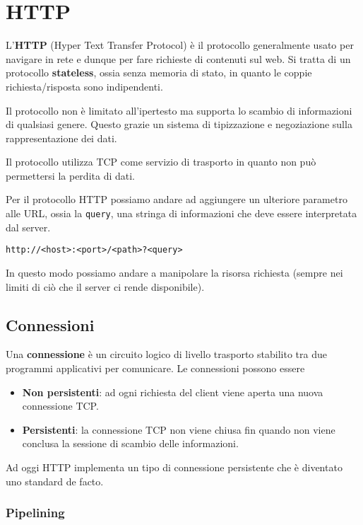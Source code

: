 \section{HTTP}
L'\textbf{HTTP} (Hyper Text Transfer Protocol) è il protocollo generalmente usato per navigare in
rete e dunque per fare richieste di contenuti sul web. Si tratta di un protocollo
\textbf{stateless}, ossia senza memoria di stato, in quanto le coppie richiesta/risposta sono
indipendenti.

Il protocollo non è limitato all'ipertesto ma supporta lo scambio di informazioni di qualsiasi 
genere. Questo grazie un sistema di tipizzazione e negoziazione sulla rappresentazione dei dati.

Il protocollo utilizza TCP come servizio di trasporto in quanto non può permettersi la perdita di
dati.

Per il protocollo HTTP possiamo andare ad aggiungere un ulteriore parametro alle URL, ossia la
\verb|query|, una stringa di informazioni che deve essere interpretata dal server.
\begin{center} \verb|http://<host>:<port>/<path>?<query>| \end{center}
In questo modo possiamo andare a manipolare la risorsa richiesta (sempre nei limiti di ciò che il
server ci rende disponibile).

\subsection{Connessioni}
Una \textbf{connessione} è un circuito logico di livello trasporto stabilito tra due programmi
applicativi per comunicare. Le connessioni possono essere
\begin{itemize}
	\item \textbf{Non persistenti}: ad ogni richiesta del client viene aperta una nuova connessione
		TCP.
	\item \textbf{Persistenti}: la connessione TCP non viene chiusa fin quando non viene conclusa 
		la sessione di scambio delle informazioni.
\end{itemize}
Ad oggi HTTP implementa un tipo di connessione persistente che è diventato uno standard de facto.

\subsubsection{Pipelining}
